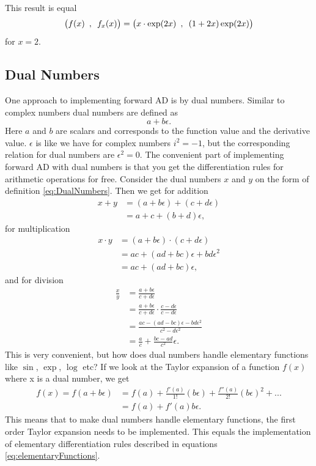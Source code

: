 This result is equal
\begin{equation*}
    \big(f(x) \hspace{0.5em},\hspace{0.5em} f_x(x)\big) = \big(x\cdot\exp(2x) \hspace{0.5em},\hspace{0.5em} (1+2x)\exp(2x)\big)
\end{equation*}
for $x = 2$.


\subsection{Dual Numbers}
One approach to implementing forward AD is by dual numbers. Similar to complex numbers dual numbers are defined as 
\begin{equation}
    a + b\epsilon.
    \label{eq:DualNumbers}
\end{equation}
Here $a$ and $b$ are scalars and corresponds to the function value and the derivative value. $\epsilon$ is like we have for complex numbers $i^2 = -1$, but the corresponding relation for dual numbers are $\epsilon^2 = 0$. The convenient part of implementing forward AD with dual numbers is that you get the differentiation rules for arithmetic operations for free. Consider the dual numbers $x$ and $y$ on the form of definition \eqref{eq:DualNumbers}. Then we get for addition
\begin{align*}
x+y &= (a+b\epsilon)+(c+d\epsilon)\\
    &= a+c+(b+d)\epsilon,
\end{align*}
for multiplication
\begin{align*}
x\cdot y &= (a+b\epsilon)\cdot(c+d\epsilon)\\
    &= ac + (ad + bc)\epsilon + bd\epsilon^2 \\
    &= ac + (ad + bc)\epsilon,
\end{align*}
and for division
\begin{align*}
\frac{x}{y} &= \frac{a+b\epsilon}{c+d\epsilon}\\
    &=\frac{a+b\epsilon}{c+d\epsilon} \cdot \frac{c-d\epsilon}{c-d\epsilon}\\
    &=\frac{ac-(ad-bc)\epsilon-bd\epsilon^2}{c^2-d\epsilon^2}\\
    &=\frac{a}{c} + \frac{bc-ad}{c^2}\epsilon.
\end{align*}
This is very convenient, but how does dual numbers handle elementary functions like $\sin$, $\exp$, $\log$ etc? If we look at the Taylor expansion of a function $f(x)$ where x is a dual number, we get
\begin{align*}
    f(x) = f(a+b\epsilon) &= f(a) + \frac{f'(a)}{1!}(b\epsilon) + \frac{f''(a)}{2!}(b\epsilon)^2+...\\
        &=f(a) + f'(a)b\epsilon.
\end{align*}
This means that to make dual numbers handle elementary functions, the first order Taylor expansion needs to be implemented. This equals the implementation of elementary differentiation rules described in equations \eqref{eq:elementaryFunctions}. 

